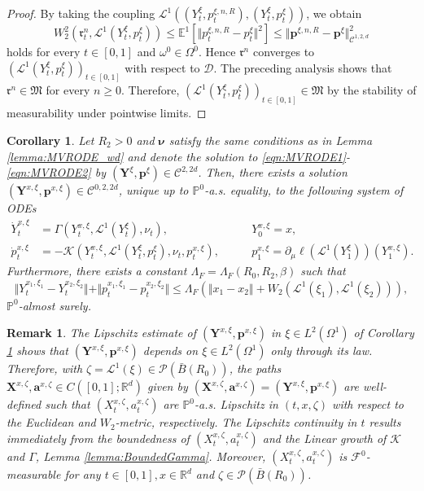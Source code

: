 \documentclass{article}
\newtheorem{remark}[theorem]{Remark}
\newtheorem{corollary}[theorem]{Corollary}
\newcommand{\R}{\mathbb{R}}
\newcommand{\E}{\mathbb{E}}
\begin{document}
\begin{appendices}
\begin{proof}
By taking the coupling $\mathcal L^1((Y^{\xi}_t,p^{\xi,n,R}_t), (Y^\xi_t,p^\xi_t)) $, we obtain
\[
W^2_2(\mathfrak{r}^n_t, \mathcal L^1(Y^\xi_t,p^\xi_t))\le \E^1\left[\Vert p^{\xi,n,R}_t-p^{\xi}_t\Vert^2\right]\le \Vert \bm p^{\xi,n,R}-\bm p^{\xi}\Vert^2_{\mathscr{C}^{1,2,d}}
\]
holds for every $t\in[0,1]$ and $\omega^0\in \Omega^0$. Hence $\bm{\mathfrak{r}}^n$ converges to $( \mathcal L^1(Y^\xi_t,p^\xi_t))_{t\in[0,1]}$ with respect to $\mathcal D$. The preceding analysis shows that $\bm{\mathfrak{r}}^n\in\mathfrak{M}$ for every $n\ge0$. Therefore, $(\mathcal L^1(Y^\xi_t,p^\xi_t))_{t\in[0,1]}\in \mathfrak{M}$ by the stability of measurability under pointwise limits.
\end{proof}

\begin{corollary}\label{cor:FlowMap_wd}
Let $R_2>0$ and $\bm{\nu}$ satisfy the same conditions as in Lemma \ref{lemma:MVRODE_wd} and denote the solution to \eqref{eqn:MVRODE1}-\eqref{eqn:MVRODE2} by $(\bm{Y}^\xi,\bm p^\xi)\in \mathscr{C}^{2,2d}$. Then, there exists a solution $(\bm Y^{x,\xi}, \bm p^{x,\xi})\in \mathscr{C}^{0,2,2d}$, unique up to $\mathbb P^0$-a.s. equality, to the following system of ODEs
    \begin{align}
    \dot{Y}^{x,\xi}_t &= \Gamma(Y^{x,\xi}_t, \mathcal L^1(Y^\xi_t),\nu_t), \qquad & Y_0^{x,\xi}=x,\label{eqn:FMY}\\
    \dot{p}^{x,\xi}_t &= -\mathcal K(Y^{x,\xi}_t, \mathcal L^1(Y^\xi_t, p^\xi_t),\nu_t, p^{x,\xi}_t), \qquad & p_1^{x,\xi}=\partial_\mu\ell(\mathcal L^1(Y^\xi_1))(Y^{x,\xi}_1).\label{eqn:FMp}
    \end{align}
Furthermore, there exists a constant $\Lambda_F=\Lambda_F(R_0,R_2,\beta)$ such that
\[
\Vert Y^{x_1,\xi_1}_t-Y^{x_2,\xi_2}_t\Vert + \Vert p^{x_1,\xi_1}_t-p^{x_2,\xi_2}_t\Vert \le \Lambda_F \left( \Vert x_1-x_2\Vert + W_2(\mathcal L^1(\xi_1),\mathcal L^1(\xi_2))\right),
\]
$\mathbb P^0$-almost surely.
\end{corollary}
\begin{remark}\label{remark:flow}
   The Lipschitz estimate of $(\bm Y^{x,\xi},\bm p^{x,\xi})$ in $\xi\in L^2(\Omega^1)$ of Corollary \ref{cor:FlowMap_wd} shows that $(\bm{Y}^{x,\xi}, \bm p^{x,\xi})$ depends on $\xi \in L^2(\Omega^1)$ only through its law. Therefore, with $\zeta = \mathcal L^1(\xi)\in \mathcal P(\bar B(R_0))$, the paths
$\bm{X}^{x,\zeta},\bm{a}^{x,\zeta}\in C([0,1]; \R^d)$ given by $(\bm{X}^{x,\zeta},\bm{a}^{x,\zeta})=(\bm{Y}^{x,\xi},\bm{p}^{x,\xi})$ are well-defined such that $(X_t^{x,\zeta},a_t^{x,\zeta})$ are $\mathbb P^0$-a.s. Lipschitz in $(t,x,\zeta)$ with respect to the Euclidean and $W_2$-metric, respectively. The Lipschitz continuity in $t$ results immediately from the boundedness of $(X^{x,\zeta}_t,a^{x,\zeta}_t)$ and the Linear growth of $\mathcal K$ and $\Gamma$, Lemma \ref{lemma:BoundedGamma}. Moreover, $(X_t^{x,\zeta},a_t^{x,\zeta})$ is $\mathcal F^0$-measurable for any $t\in[0,1], x\in \R^d$ and $\zeta \in \mathcal P(\bar B(R_0))$. 

\end{remark}
\end{appendices}
\end{document}
